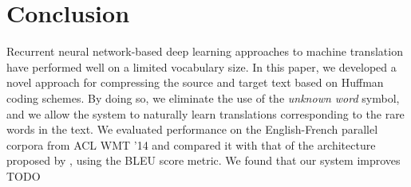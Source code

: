 \section{Conclusion}
\label{sec:conclusion}

Recurrent neural network-based deep learning approaches
to machine translation have performed well on a limited vocabulary
size. In this paper, we developed a novel approach for compressing
the source and target text based on Huffman coding schemes. By doing
so, we eliminate the use of the \emph{unknown word} symbol,
and we allow the system to naturally learn translations corresponding
to the rare words in the text. We evaluated performance on the English-French
parallel corpora from ACL WMT '14 and compared it with that of the architecture
proposed by , using the BLEU score metric.
We found that our system improves TODO\\